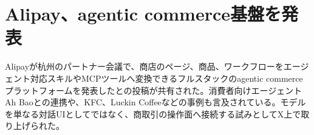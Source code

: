 \section{Alipay、agentic commerce基盤を発表}
Alipayが杭州のパートナー会議で、商店のページ、商品、ワークフローをエージェント対応スキルやMCPツールへ変換できるフルスタックのagentic commerceプラットフォームを発表したとの投稿が共有された。消費者向けエージェントAh Baoとの連携や、KFC、Luckin Coffeeなどの事例も言及されている。モデルを単なる対話UIとしてではなく、商取引の操作面へ接続する試みとしてX上で取り上げられた。
